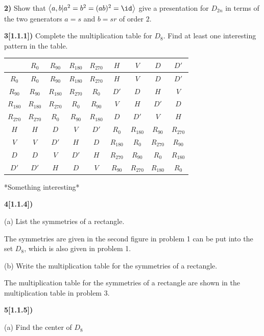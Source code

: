 \documentclass[12pt,a4paper]{article}
\newcommand{\prob}[2]{\textbf{#1)} #2}
\begin{document}
\prob{2}{Show that $\left<a,b | a^2=b^2=(ab)^2=\id \right>$ give a presentation for $D_{2n}$ in terms of the two generators $a = s$ and $b = sr$ of order $2$.}

\prob{3[1.1.1]}{Complete the multiplication table for $D_8$. Find at least one interesting pattern in the table.}

\begin{table}[H]
 \begin{center}
  \begin{tabular}{c|cccccccc}
    & $R_{0}$ & $R_{90}$ & $R_{180}$ & $R_{270}$ & $H$ & $V$ & $D$ & $D'$ \\
  \hline
  $R_{0}$ & $R_{0}$ & $R_{90}$ & $R_{180}$ & $R_{270}$ & $H$ & $V$ & $D$ & $D'$ \\ 
  $R_{90}$ & $R_{90}$ & $R_{180}$ & $R_{270}$ & $R_{0}$ & $D'$ & $D$ & $H$ & $V$ \\
  $R_{180}$ & $R_{180}$ & $R_{270}$ & $R_{0}$ & $R_{90}$ & $V$ & $H$ & $D'$ & $D$ \\
  $R_{270}$ & $R_{270}$ & $R_{0}$ & $R_{90}$ & $R_{180}$ & $D$ & $D'$ & $V$ & $H$ \\
  $H$ & $H$ & $D$ & $V$ & $D'$ & $R_{0}$ & $R_{180}$ & $R_{90}$ & $R_{270}$ \\
  $V$ & $V$ & $D'$ & $H$ & $D$ & $R_{180}$ & $R_{0}$ & $R_{270}$ & $R_{90}$ \\
  $D$ & $D$ & $V$ & $D'$ & $H$ & $R_{270}$ & $R_{90}$ & $R_{0}$ & $R_{180}$ \\
  $D'$ & $D'$ & $H$ & $D$ & $V$ & $R_{90}$ & $R_{270}$ & $R_{180}$ & $R_{0}$ \\
  \end{tabular}
 \end{center}
\end{table}

*Something interesting*

\prob{4[1.1.4]}{}

(a) List the symmetries of a rectangle.

The symmetries are given in the second figure in problem 1 can be put into the set $D_8$, which is also given in problem 1.

(b) Write the multiplication table for the symmetries of a rectangle.

The multiplication table for the symmetries of a rectangle are shown in the multiplication table in problem 3.

\prob{5[1.1.5]}{}

(a) Find the center of $D_8$
\end{document}

